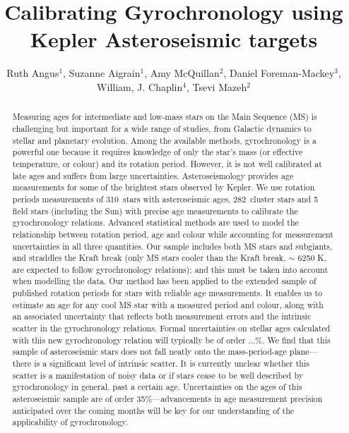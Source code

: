 \documentclass[12pt,preprint]{aastex}
\newcommand{\nastero}{310~}
\newcommand{\ncluster}{282~}
\begin{document}
\title{Calibrating Gyrochronology using Kepler Asteroseismic targets}

\author{Ruth Angus$^1$, Suzanne Aigrain$^1$, Amy McQuillan$^2$, Daniel Foreman-Mackey$^3$,  William, J. Chaplin$^4$, Tsevi Mazeh$^2$}

\begin{abstract}
\label{abs}

Measuring ages for intermediate and low-mass stars on the Main Sequence (MS) is challenging but important for a wide range of studies, from Galactic dynamics to stellar and planetary evolution.
Among the available methods, gyrochronology is a powerful one because it requires knowledge of only the star's mass (or effective temperature, or colour) and its rotation period.
However, it is not well calibrated at late ages and suffers from large uncertainties.
Asteroseismology provides age measurements for some of the brightest stars observed by Kepler.
We use rotation periods measurements of \nastero stars with asteroseismic ages, \ncluster cluster stars and 5 field stars (including the Sun) with precise age measurements to calibrate the gyrochronology relations.
Advanced statistical methods are used to model the relationship between rotation period, age and colour while accounting for measurement uncertainties in all three quantities.
Our sample includes both MS stars and subgiants, and straddles the Kraft break (only MS stars cooler than the Kraft break, $\sim$ 6250 K, are expected to follow gyrochronology relations); and this must be taken into account when modelling the data.
Our method has been applied to the extended sample of published rotation periods for stars with reliable age measurements.
It enables us to estimate an age for any cool MS star with a measured period and colour, along with an associated uncertainty that reflects both measurement errors and the intrinsic scatter in the gyrochronology relations.
Formal uncertainties on stellar ages calculated with this new gyrochronology relation will typically be of order ...\%.
We find that this sample of asteroseismic stars does not fall neatly onto the mass-period-age plane---there is a significant level of intrinsic scatter.
It is currently unclear whether this scatter is a manifestation of noisy data or if stars cease to be well described by gyrochronology in general, past a certain age.
Uncertainties on the ages of this asteroseismic sample are of order 35\%---advancements in age measurement precision anticipated over the coming months will be key for our understanding of the applicability of gyrochronology.

\end{abstract}
\end{document}
